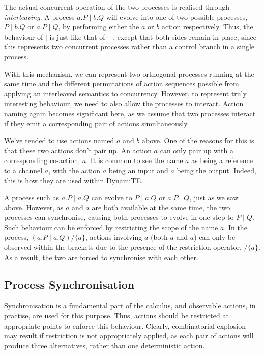 \documentclass{sig-alternate}
\newcommand{\hide}[1]{/ \{{#1}\}}
\begin{document}
The actual concurrent operation of the two processes is realised through
\emph{interleaving}.  A process $a.P \mid b.Q$ will evolve into one of
two possible processes, $P \mid b.Q$ or $a.P \mid Q$, by performing
either the $a$ or $b$ action respectively.  Thus, the behaviour of
$\mid$ is just like that of $+$, except that both sides remain in place,
since this represents two concurrent processes rather than a control
branch in a single process.

With this mechanism, we can represent two orthogonal processes running
at the same time and the different permutations of action sequences
possible from applying an interleaved semantics to concurrency.
However, to represent truly interesting behaviour, we need to also
allow the processes to interact.  Action naming again becomes
significant here, as we assume that two processes interact if they emit
a corresponding pair of actions simultaneously.

We've tended to use actions named $a$ and $b$ above.  One of the reasons
for this is that these two actions don't pair up.  An action $a$ can
only pair up with a corresponding co-action, $\overline{a}$.  It is
common to see the name $a$ as being a reference to a channel $a$, with
the action $a$ being an input and $\overline{a}$ being the output.
Indeed, this is how they are used within DynamiTE.

A process such as $a.P \mid \overline{a}.Q$ can evolve to $P \mid
\overline{a}.Q$ or $a.P \mid Q$, just as we saw above.  However, as $a$
and $\overline{a}$ are both available at the same time, the two
processes can synchronise, causing both processes to evolve in one
step to $P \mid Q$.  Such behaviour can be enforced by restricting the
scope of the name $a$.  In the process, $(a.P \mid \overline{a}.Q)
\hide{a}$, actions involving $a$ (both $a$ and $\overline{a}$) can only
be observed within the brackets due to the presence of the restriction
operator, $\hide{a}$.  As a result, the two are forced to synchronise
with each other.

\subsection{Process Synchronisation}
\label{sync}

Synchronisation is a fundamental part of the calculus, and observable
actions, in practise, are used for this purpose.  Thus, actions should
be restricted at appropriate points to enforce this behaviour.  Clearly,
combinatorial explosion may result if restriction is not appropriately
applied, as each pair of actions will produce three alternatives, rather
than one deterministic action.  
\end{document}

